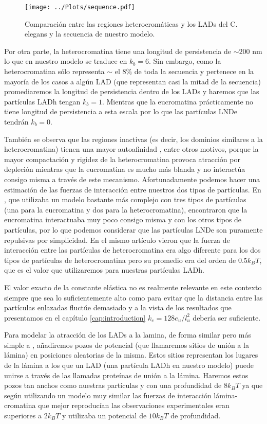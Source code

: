 \begin{figure}
    \centering
    \texttt{[image: ../Plots/sequence.pdf]}
    \caption{Comparación entre las regiones heterocromáticas y los LADs del C. elegans y la secuencia de nuestro modelo.}
    \label{fig:sequence}
\end{figure}

Por otra parte, la heterocromatina tiene una longitud de persistencia de $\sim200$ nm \cite{Bystricky2004} lo que en nuestro modelo se traduce en $k_b=6$. Sin embargo, como la heterocromatina sólo representa $\sim$ el $8\%$ de toda la secuencia y pertenece en la mayoría de los casos a algún LAD (que representan casi la mitad de la secuencia) promediaremos la longitud de persistencia dentro de los LADs y haremos que las partículas LADh tengan $k_b=1$. Mientras que la eucromatina prácticamente no tiene longitud de persistencia a esta escala por lo que las partículas LNDe tendrán $k_b=0$.

También se observa que las regiones inactivas (es decir, los dominios similares a la heterocromatina) tienen una mayor autoafinidad \cite{Camara2023}, entre otros motivos, porque la mayor compactación y rigidez de la heterocromatina provoca atracción por depleción mientras que la eucromatina es mucho más blanda y no interactúa consigo misma a través de este mecanismo. Afortunadamente podemos hacer una estimación de las fuerzas de interacción entre nuestros dos tipos de partículas. En \cite{Falk2019}, que utilizaba un modelo bastante más complejo con tres tipos de partículas (una para la eucromatina y dos para la heterocromatina), encontraron que la eucromatina interactuaba muy poco consigo misma y con los otros tipos de partículas, por lo que podemos considerar que las partículas LNDe son puramente repulsivas por simplicidad. En el mismo artículo vieron que la fuerza de interacción entre las partículas de heterocromatina era algo diferente para los dos tipos de partículas de heterocromatina pero su promedio era del orden de $0.5k_BT$, que es el valor que utilizaremos para nuestras partículas LADh.

El valor exacto de la constante elástica no es realmente relevante en este contexto siempre que sea lo suficientemente alto como para evitar que la distancia entre las partículas enlazadas fluctúe demasiado y a la vista de los resultados que presentamos en el capítulo \ref{cap:introduction} $k_e=128e_u/l_u^2$ debería ser suficiente.

Para modelar la atracción de los LADs a la lamina, de forma similar pero más simple a \cite{Bajpai2021}, añadiremos pozos de potencial (que llamaremos sitios de unión a la lámina) en posiciones aleatorias de la misma. Estos sitios representan los lugares de la lámina a los que un LAD (una partícula LADh en nuestro modelo) puede unirse a través de las llamadas proteínas de unión a la lámina. Haremos estos pozos tan anchos como nuestras partículas y con una profundidad de $8k_BT$ ya que según \cite{Maji2020} utilizando un modelo muy similar las fuerzas de interacción lámina-cromatina que mejor reproducían las observaciones experimentales eran superiores a $2k_BT$ y \cite{Bajpai2021} utilizaba un potencial de $10k_BT$ de profundidad.

